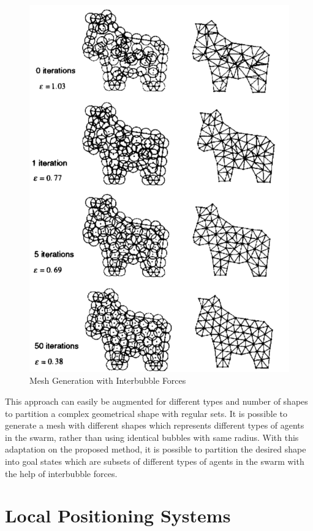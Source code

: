 \begin{figure}[H]
	\caption{Mesh Generation with Interbubble Forces \cite{27}} \label{mesh_genearation_ref}
	\centering
	\includegraphics[scale = 0.4]{interbubble2}
\end{figure}

This approach can easily be augmented for different types and number of shapes to partition a complex geometrical shape with regular sets. It is possible to generate a mesh with different shapes which represents different types of agents in the swarm, rather than using identical bubbles with same radius. With this adaptation on the proposed method, it is possible to partition the desired shape into goal states which are subsets of different types of agents in the swarm with the help of interbubble forces. 

\section{Local Positioning Systems} \label{LPS_systems_ref}


